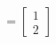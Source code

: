 \documentclass[preview]{standalone}
\begin{document}
\begin{align*}
= \begin{bmatrix} 1 \\ 2 \end{bmatrix}
\end{align*}
\end{document}
